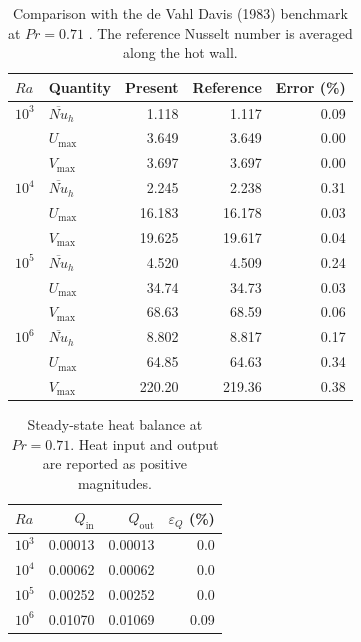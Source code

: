 \documentclass[preprint,3p,number]{elsarticle}
\begin{document}
\begin{table}[htbp]
    \centering
    \caption{Comparison with the de Vahl Davis (1983)
    benchmark at $Pr=0.71$ \cite{davis1983}. The reference Nusselt number
    is averaged along the hot wall.}
    \label{tab:benchmark_validation}
    \begin{tabular}{llrrr}
        \toprule
        $Ra$ & Quantity & Present & Reference & Error (\%) \\
        \midrule
        $10^3$ & $\overline{Nu}_h$ & 1.118 & 1.117 & 0.09 \\
               & $U_{\max}$       & 3.649 & 3.649 & 0.00 \\
               & $V_{\max}$       & 3.697 & 3.697 & 0.00 \\
        \midrule
        $10^4$ & $\overline{Nu}_h$ & 2.245 & 2.238 & 0.31\\
               & $U_{\max}$       & 16.183 & 16.178 & 0.03 \\
               & $V_{\max}$       & 19.625 & 19.617 & 0.04 \\
        \midrule
        $10^5$ & $\overline{Nu}_h$ & 4.520 & 4.509 & 0.24 \\
               & $U_{\max}$       & 34.74 & 34.73 & 0.03 \\
               & $V_{\max}$       & 68.63 & 68.59 & 0.06 \\
        \midrule
        $10^6$ & $\overline{Nu}_h$ & 8.802 & 8.817 & 0.17 \\
               & $U_{\max}$       & 64.85 & 64.63 & 0.34 \\
               & $V_{\max}$       & 220.20 & 219.36 & 0.38 \\
        \bottomrule
    \end{tabular}
\end{table}

\begin{table}[htbp]
    \centering
    \caption{Steady-state heat balance at $Pr=0.71$.
    Heat input and output are reported as positive magnitudes.}
    \label{tab:heat_balance}
    \begin{tabular}{lrrr}
        \toprule
        $Ra$ & $Q_{\mathrm{in}}$ & $Q_{\mathrm{out}}$
             & $\varepsilon_Q$ (\%) \\
        \midrule
        $10^3$ & 0.00013 & 0.00013 & 0.0 \\
        $10^4$ & 0.00062 & 0.00062 & 0.0 \\
        $10^5$ & 0.00252 & 0.00252 & 0.0 \\
        $10^6$ & 0.01070 & 0.01069 & 0.09 \\
        \bottomrule
    \end{tabular}
\end{table}
\end{document}
